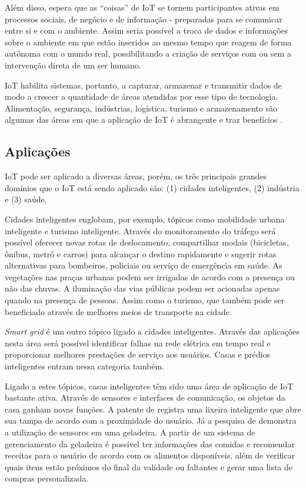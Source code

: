 Além disso,  espera que as ``coisas''
de IoT se tornem participantes ativas em processos sociais, de negócio e de 
informação - preparadas para se comunicar entre si e com o ambiente. Assim seria possível
a troca de dados e informações sobre o ambiente em que estão inseridos ao mesmo
tempo que reagem de forma autônoma com o mundo real, possibilitando a criação
de serviços com ou sem a intervenção direta de um ser humano.


IoT habilita sistemas, portanto, a capturar, armazenar e transmitir dados de modo a
crescer a quantidade de áreas atendidas por esse tipo de tecnologia.
Alimentação, segurança, indústrias, logística, turismo e armazenamento são
algumas das áreas em que a aplicação de IoT é abrangente e traz benefícios
\cite{xu2014ubiquitous}.

\subsection{Aplicações} \label{subsec:iot-aplicacoes}

IoT pode ser aplicado a diversas áreas, porém, os três principais grandes 
domínios que o IoT está sendo aplicado são: (1) cidades inteligentes, 
(2) indústria e (3) saúde.

Cidades inteligentes englobam, por exemplo, tópicos como mobilidade urbana
inteligente e turismo inteligente. Através do monitoramento do tráfego será
possível oferecer novas rotas de deslocamento, compartilhar modais (bicicletas,
ônibus, metrô e carros) para alcançar o destino rapidamente e sugerir rotas
alternativas para bombeiros, policiais ou serviço de emergência em saúde. As
vegetações nas praças urbanas podem ser irrigadas de acordo com a presença ou
não das chuvas. A iluminação das vias públicas podem ser acionadas apenas
quando na presença de pessoas. Assim como o turismo, que também pode ser
beneficiado através de melhores meios de transporte na cidade. 

\textit{Smart grid} é um outro tópico ligado a cidades inteligentes. Através
das aplicações nesta área será possível identificar falhas na rede elétrica em 
tempo real e proporcionar melhores prestações de serviço aos usuários. Casas
e prédios inteligentes entram nessa categoria também.

Ligado a estes tópicos, casas inteligentes têm sido uma área de aplicação de
IoT bastante ativa. Através de sensores e interfaces de comunicação, os objetos
da casa ganham novas funções. A patente de  registra
uma lixeira inteligente que abre sua tampa de acordo com a proximidade do
usuário. Já a pesquisa de  demonstra a utilização de
sensores em uma geladeira. A partir de um sistema de gerenciamento da geladeira
é possível ter informações das comidas e recomendar receitas para o usuário de
acordo com os alimentos disponíveis, além de verificar quais itens estão
próximos do final da validade ou faltantes e gerar uma lista de compras
personalizada.

